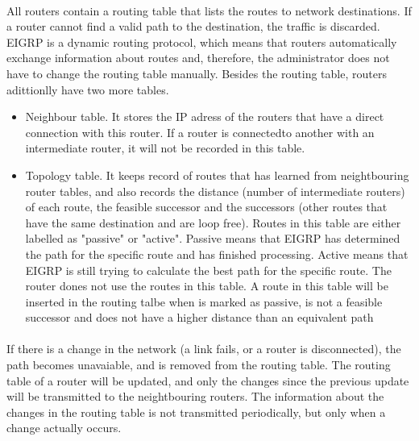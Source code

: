 \documentclass[12pt,a4paper]{report}
\begin{document}
\paragraph{}All routers contain a routing table that lists the routes to network destinations. If a router cannot find a valid path to the destination, the traffic is discarded. EIGRP is a dynamic routing protocol, which means that routers automatically exchange information about routes and, therefore, the administrator does not have to change the routing table manually. Besides the routing table, routers adittionlly have two more tables.
\begin{itemize}
	\item Neighbour table. It stores the IP adress of the routers that have a direct connection with this router. If a router is connectedto another with an intermediate router, it will not be recorded in this table.
	\item Topology table. It keeps record of routes that has learned from neightbouring router tables, and also records the distance (number of intermediate routers) of each route, the feasible successor and the successors (other routes that have the same destination and are loop free). Routes in this table are either labelled as "passive" or "active". Passive means that EIGRP  has determined the path for the specific route and has finished processing. Active means that EIGRP is still trying to calculate the best path for the specific route. The router dones not use the routes in this table. A route in this table will be inserted in the routing talbe when is marked as passive, is not a feasible successor and does not have a higher distance than an equivalent path
\end{itemize}
\paragraph{}If there is a change in the network (a link fails, or a router is disconnected), the path becomes unavaiable, and is removed from the routing table. The routing table of a router will be updated, and only the changes since the previous update will be transmitted to the neightbouring routers. The information about the changes in the routing table is not transmitted periodically, but only when a change actually occurs.
\end{document}
